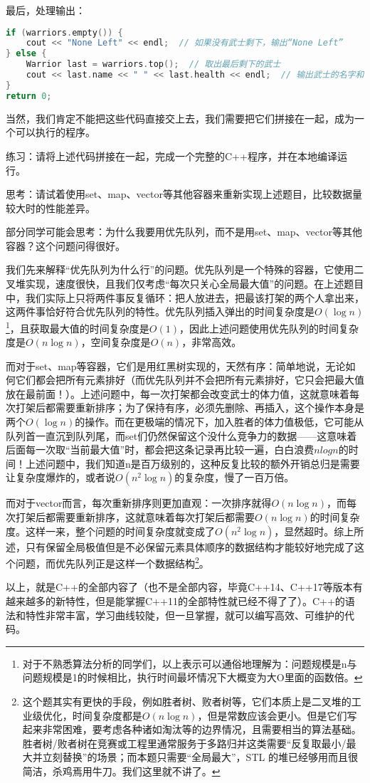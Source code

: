 \documentclass[../main.tex]{subfiles}
\begin{document}
最后，处理输出：
\begin{lstlisting}[language=C++]
if (warriors.empty()) {
    cout << "None Left" << endl;  // 如果没有武士剩下，输出“None Left”
} else {
    Warrior last = warriors.top();  // 取出最后剩下的武士
    cout << last.name << " " << last.health << endl;  // 输出武士的名字和体力值
}
return 0;
\end{lstlisting}

当然，我们肯定不能把这些代码直接交上去，我们需要把它们拼接在一起，成为一个可以执行的程序。

练习：请将上述代码拼接在一起，完成一个完整的C++程序，并在本地编译运行。

思考：请试着使用set、map、vector等其他容器来重新实现上述题目，比较数据量较大时的性能差异。

部分同学可能会思考：为什么我要用优先队列，而不是用set、map、vector等其他容器？这个问题问得很好。

我们先来解释“优先队列为什么行”的问题。优先队列是一个特殊的容器，它使用二叉堆实现，速度很快，且我们仅考虑“每次只关心全局最大值”的问题。在上述题目中，我们实际上只将两件事反复循环：把人放进去，把最该打架的两个人拿出来，这两件事恰好符合优先队列的特性。优先队列插入弹出的时间复杂度是$O(\log n)$\footnote{对于不熟悉算法分析的同学们，以上表示可以通俗地理解为：问题规模是n与问题规模是1的时候相比，执行时间最坏情况下大概变为大O里面的函数倍。}，且获取最大值的时间复杂度是$O(1)$，因此上述问题使用优先队列的时间复杂度是$O(n \log n)$，空间复杂度是$O(n)$，非常高效。

而对于set、map等容器，它们是用红黑树实现的，天然有序：简单地说，无论如何它们都会把所有元素排好（而优先队列并不会把所有元素排好，它只会把最大值放在最前面！）。上述问题中，每一次打架都会改变武士的体力值，这就意味着每次打架后都需要重新排序；为了保持有序，必须先删除、再插入，这个操作本身是两个$O(\log n)$的操作。而在更极端的情况下，加入胜者的体力值极低，它可能从队列首一直沉到队列尾，而set们仍然保留这个没什么竞争力的数据——这意味着后面每一次取“当前最大值”时，都会把这条记录再比较一遍，白白浪费$n log n $的时间！上述问题中，我们知道n是百万级别的，这种反复比较的额外开销总归是需要让复杂度爆炸的，或者说$O(n^2 \log n)$的复杂度，慢了一百万倍。

而对于vector而言，每次重新排序则更加直观：一次排序就得$O(n \log n)$，而每次打架后都需要重新排序，这就意味着每次打架后都需要$O(n \log n)$的时间复杂度。这样一来，整个问题的时间复杂度就变成了$O(n^2 \log n)$，显然超时。综上所述，只有保留全局极值但是不必保留元素具体顺序的数据结构才能较好地完成了这个问题，而优先队列正是这样一个数据结构\footnote{这个题其实有更快的手段，例如胜者树、败者树等，它们本质上是二叉堆的工业级优化，时间复杂度都是$O(n \log n)$，但是常数应该会更小。但是它们写起来非常困难，要考虑各种诸如淘汰等的边界情况，且需要相当的算法基础。胜者树/败者树在竞赛或工程里通常服务于多路归并这类需要“反复取最小/最大并立刻替换”的场景；而本题只需要“全局最大”，STL 的堆已经够用而且很简洁，杀鸡焉用牛刀。我们这里就不讲了。}。

以上，就是C++的全部内容了（也不是全部内容，毕竟C++14、C++17等版本有越来越多的新特性，但是能掌握C++11的全部特性就已经不得了了）。C++的语法和特性非常丰富，学习曲线较陡，但一旦掌握，就可以编写高效、可维护的代码。
\end{document}
